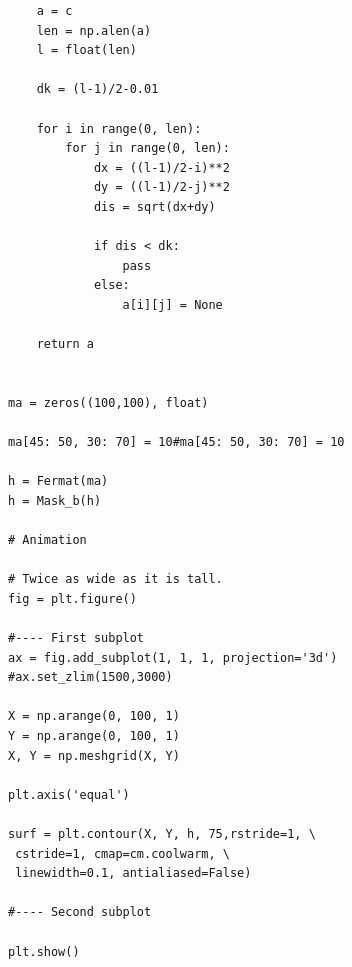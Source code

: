 \documentclass[pdftex,12pt,a4paper]{article}
\begin{document}
\begin{lstlisting}
    a = c
    len = np.alen(a)
    l = float(len)
    
    dk = (l-1)/2-0.01
    
    for i in range(0, len):
        for j in range(0, len):
            dx = ((l-1)/2-i)**2
            dy = ((l-1)/2-j)**2
            dis = sqrt(dx+dy)
            
            if dis < dk:
                pass
            else:
                a[i][j] = None
                
    return a    
    
    
ma = zeros((100,100), float)

ma[45: 50, 30: 70] = 10#ma[45: 50, 30: 70] = 10
        
h = Fermat(ma)
h = Mask_b(h)

# Animation

# Twice as wide as it is tall.
fig = plt.figure()

#---- First subplot
ax = fig.add_subplot(1, 1, 1, projection='3d')
#ax.set_zlim(1500,3000)

X = np.arange(0, 100, 1)
Y = np.arange(0, 100, 1)
X, Y = np.meshgrid(X, Y)

plt.axis('equal')

surf = plt.contour(X, Y, h, 75,rstride=1, \
 cstride=1, cmap=cm.coolwarm, \
 linewidth=0.1, antialiased=False)

#---- Second subplot

plt.show()




\end{lstlisting}
\end{document}

